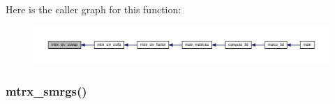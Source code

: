 Here is the caller graph for this function\+:
\nopagebreak
\begin{figure}[H]
\begin{center}
\leavevmode
\includegraphics[width=350pt]{Marco_8f90_a41de629eee6c3a88f303346f2fe77e42_icgraph}
\end{center}
\end{figure}
\mbox{\label{Marco_8f90_a8a072791471b5fe2faf76549b6845ab9}} 
\subsubsection{\texorpdfstring{mtrx\+\_\+smrgs()}{mtrx\_smrgs()}}
